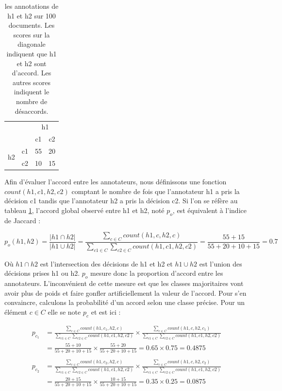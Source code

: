 \documentclass[12pt,a4paper,times,twoside,openright]{report}
\begin{document}
\begin{table}[ht!]
\centering
\begin{tabular}{|cc|cc|}
\cline{3-4}
\multicolumn{2}{c|}{}      & \multicolumn{2}{c|}{h1} \\
\multicolumn{2}{c|}{}      & c1  & c2 \\
\hline
\multirow{2}{*}{h2}   & c1 & 55 & 20 \\
                      & c2 & 10 & 15 \\
\hline
\end{tabular}
\caption{les annotations de h1 et h2 sur 100 documents. Les scores sur la diagonale indiquent que h1 et h2 sont d'accord. Les autres scores indiquent le nombre de désaccords.}
\label{tab:h1-h2-annotations}
\end{table}

Afin d'évaluer l'accord entre les annotateurs, nous définissons une fonction $count(h1,c1,h2,c2)$ comptant le nombre de fois que l'annotateur h1 a pris la décision c1 tandis que l'annotateur h2 a pris la décision c2. Si l'on se réfère au tableau \ref{tab:h1-h2-annotations}, l'accord global observé entre h1 et h2, noté $p_{o}$, est équivalent à l'indice de Jaccard :

\begin{equation}\label{eq:h1-h2-raw-agreement}
p_{o}(h1,h2) = \frac{|h1 \cap h2|}{|h1 \cup h2|} = \frac{\sum_{c \in C} count(h1,c,h2,c)}{\sum_{c1 \in C} \sum_{c2 \in C} count(h1,c1,h2,c2)} = \frac{55 + 15}{55 + 20 + 10 + 15} = 0.7
\end{equation}

Où $h1 \cap h2$ est l'intersection des décisions de h1 et h2 et $h1 \cup h2$ est l'union des décisions prises h1 ou h2. $p_{o}$ mesure donc la proportion d'accord entre les annotateurs. L'inconvénient de cette mesure est que les classes majoritaires vont avoir plus de poids et faire gonfler artificiellement la valeur de l'accord. Pour s'en convaincre, calculons la probabilité d'un accord selon une classe précise. Pour un élément $c \in C$ elle se note $p_{c}$ et est ici :

\begin{equation}\label{eq:h1-h2-per-class-agreement}
\begin{aligned}
p_{c_{1}} &= \frac{\sum_{c \in C} count(h1,c_{1},h2,c)}{\sum_{c1 \in C} \sum_{c2 \in C} count(h1,c1,h2,c2)} \times \frac{\sum_{c \in C} count(h1,c,h2,c_{1})}{\sum_{c1 \in C} \sum_{c2 \in C} count(h1,c1,h2,c2)} \\
      &= \frac{55 + 10}{55 + 20 + 10 + 15} \times \frac{55 + 20}{55 + 20 + 10 + 15} = 0.65 \times 0.75 = 0.4875 \\
\\
p_{c_{2}} &= \frac{\sum_{c \in C} count(h1,c_{2},h2,c)}{\sum_{c1 \in C} \sum_{c2 \in C} count(h1,c1,h2,c2)} \times \frac{\sum_{c \in C} count(h1,c,h2,c_{2})}{\sum_{c1 \in C} \sum_{c2 \in C} count(h1,c1,h2,c2)} \\
      &= \frac{20 + 15}{55 + 20 + 10 + 15} \times \frac{10 + 15}{55 + 20 + 10 + 15} = 0.35 \times 0.25 = 0.0875 \\
\end{aligned}
\end{equation}
\end{document}
